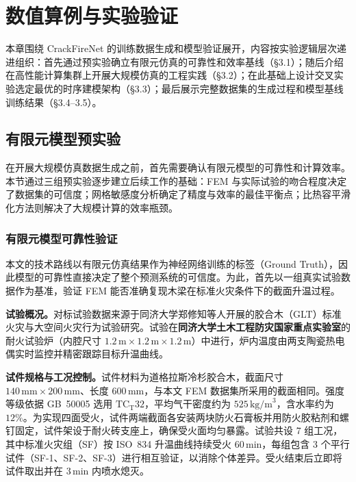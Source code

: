 \chapter{数值算例与实验验证}
\label{chap:results}

本章围绕 CrackFireNet 的训练数据生成和模型验证展开，内容按实验逻辑层次递进组织：首先通过预实验确立有限元仿真的可靠性和效率基线（\S3.1）；随后介绍在高性能计算集群上开展大规模仿真的工程实践（\S3.2）；在此基础上设计交叉实验选定最优的时序建模架构（\S3.3）；最后展示完整数据集的生成过程和模型基线训练结果（\S3.4--3.5）。

\section{有限元模型预实验}
\label{sec:fem_preexp}

在开展大规模仿真数据生成之前，首先需要确认有限元模型的可靠性和计算效率。本节通过三组预实验逐步建立后续工作的基础：FEM 与实际试验的吻合程度决定了数据集的可信度；网格敏感度分析确定了精度与效率的最佳平衡点；比热容平滑化方法则解决了大规模计算的效率瓶颈。

\subsection{有限元模型可靠性验证}

本文的技术路线以有限元仿真结果作为神经网络训练的标签（Ground Truth），因此模型的可靠性直接决定了整个预测系统的可信度。为此，首先以一组真实试验数据作为基准，验证 FEM 能否准确复现木梁在标准火灾条件下的截面升温过程。

\textbf{试验概况。}对标试验数据来源于同济大学郑修知等人开展的胶合木（GLT）标准火灾与大空间火灾行为试验研究\cite{zheng2026charring}。试验在\textbf{同济大学土木工程防灾国家重点实验室}的耐火试验炉（内腔尺寸 $1.2\,\text{m} \times 1.2\,\text{m} \times 1.2\,\text{m}$）中进行，炉内温度由两支陶瓷热电偶实时监控并精密跟踪目标升温曲线。

\textbf{试件规格与工况控制。}试件材料为道格拉斯冷杉胶合木，截面尺寸 $140\,\text{mm} \times 200\,\text{mm}$、长度 $600\,\text{mm}$，与本文 FEM 数据集所采用的截面相同。强度等级依据 GB~50005 选用 $\text{TC}_\text{T}32$，平均气干密度约为 $525\,\text{kg/m}^3$，含水率约为 $12\%$。为实现四面受火，试件两端截面各安装两块防火石膏板并用防火胶粘剂和螺钉固定，试件架设于耐火砖支座上，确保受火面均匀暴露。试验共设 7 组工况，其中标准火灾组（SF）按 ISO~834 升温曲线持续受火 $60\,\text{min}$，每组包含 3 个平行试件（SF-1、SF-2、SF-3）进行相互验证，以消除个体差异。受火结束后立即将试件取出并在 $3\,\text{min}$ 内喷水熄灭。


